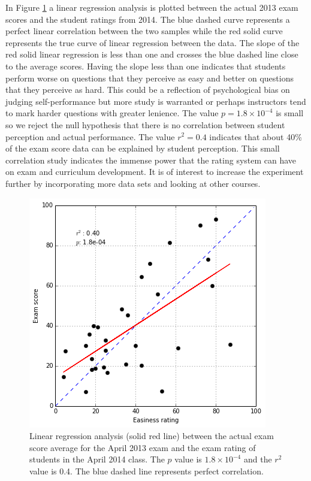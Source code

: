 \documentclass{primus}
\begin{document}
\noindent{}In Figure \ref{fig:lin_reg} a linear regression analysis is plotted between the actual 2013 exam scores and the student ratings from 2014.  The blue dashed curve represents a perfect linear correlation between the two samples while the red solid curve represents the true curve of linear regression between the data.  The slope of the red solid linear regression is less than one and crosses the blue dashed line close to the average scores.  Having the slope less than one indicates that students perform worse on questions that they perceive as easy and better on questions that they perceive as hard.  This could be a reflection of psychological bias on judging self-performance but more study is warranted or perhaps instructors tend to mark harder questions with greater lenience.  The value $p=1.8\times 10^{-4}$ is small so we reject the null hypothesis that there is no correlation between student perception and actual performance.  The value $r^2=0.4$ indicates that about 40\% of the exam score data can be explained by student perception.  This small correlation study indicates the immense power that the rating system can have on exam and curriculum development.  It is of interest to increase the experiment further by incorporating more data sets and looking at other courses. 

\begin{figure}[H]
\centering
\includegraphics[width=\textwidth]{figs/lin_reg.png}
\caption{Linear regression analysis (solid red line) between the actual exam score average for the April 2013 exam and the exam rating of students in the April 2014 class.  The $p$ value is $1.8\times 10^{-4}$ and the $r^2$ value is 0.4.  The blue dashed line represents perfect correlation.}\label{fig:lin_reg}
\end{figure}
\end{document}
